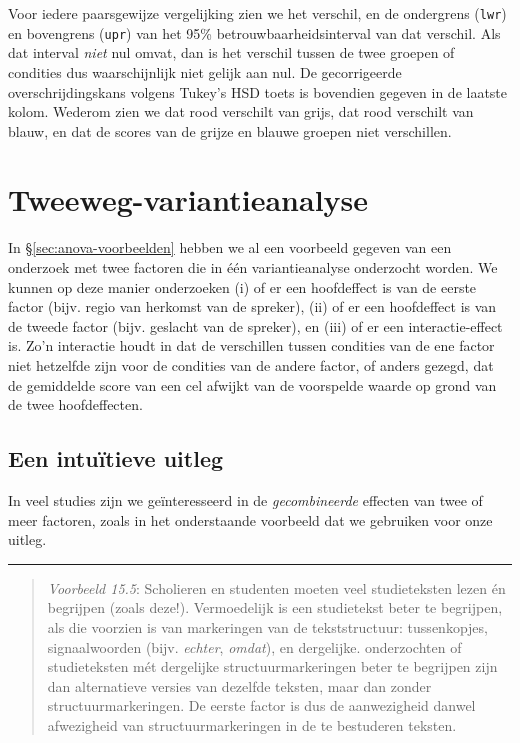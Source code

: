 \documentclass[
]{book}
\begin{document}
Voor iedere paarsgewijze vergelijking zien we het verschil, en de
ondergrens (\texttt{lwr}) en bovengrens (\texttt{upr}) van het 95\%
betrouwbaarheidsinterval van dat verschil. Als dat interval \emph{niet} nul
omvat, dan is het verschil tussen de twee groepen of condities dus
waarschijnlijk niet gelijk aan nul. De gecorrigeerde overschrijdingskans
volgens Tukey's HSD toets is bovendien gegeven in de laatste kolom.
Wederom zien we dat rood verschilt van grijs, dat rood verschilt van
blauw, en dat de scores van de grijze en blauwe groepen niet
verschillen.

\section{Tweeweg-variantieanalyse}\label{sec:tweeweg-anova}

In §\ref{sec:anova-voorbeelden} hebben we al een voorbeeld gegeven
van een onderzoek met twee factoren die in één variantieanalyse
onderzocht worden. We kunnen op deze manier onderzoeken (i) of er een
hoofdeffect is van de eerste factor (bijv. regio van herkomst van de
spreker), (ii) of er een hoofdeffect is van de tweede factor (bijv.
geslacht van de spreker), en (iii) of er een interactie-effect is. Zo'n
interactie houdt in dat de verschillen tussen condities van de ene
factor niet hetzelfde zijn voor de condities van de andere factor, of
anders gezegd, dat de gemiddelde score van een cel afwijkt van de
voorspelde waarde op grond van de twee hoofdeffecten.

\subsection{Een intuïtieve uitleg}\label{een-intuuxeftieve-uitleg}

In veel studies zijn we geïnteresseerd in de \emph{gecombineerde} effecten
van twee of meer factoren, zoals in het onderstaande voorbeeld dat we gebruiken voor onze uitleg.

\begin{center}\rule{0.5\linewidth}{0.5pt}\end{center}

\begin{quote}
\emph{Voorbeeld 15.5}:
Scholieren en studenten moeten veel studieteksten lezen én begrijpen (zoals deze!). Vermoedelijk is een studietekst beter te begrijpen, als die voorzien is van markeringen van de tekststructuur: tussenkopjes, signaalwoorden (bijv. \emph{echter}, \emph{omdat}), en dergelijke. \citet{DBE12} onderzochten of studieteksten mét dergelijke structuurmarkeringen beter te begrijpen zijn dan alternatieve versies van dezelfde teksten, maar dan zonder structuurmarkeringen. De eerste factor is dus de aanwezigheid danwel afwezigheid van structuurmarkeringen in de te bestuderen teksten.
\end{quote}
\end{document}
